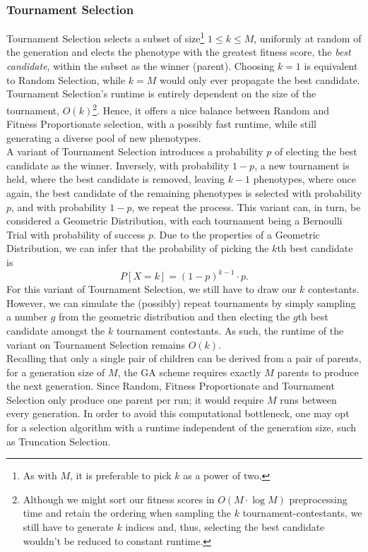 \subsubsection{Tournament Selection}
Tournament Selection selects a subset of size\footnote{As with $M$, it is preferable to pick $k$ as a power of two.} $1 \leq k \leq M$, uniformly at random of the generation and elects the phenotype with the greatest fitness score, the \textit{best candidate}, within the subset as the winner (parent). Choosing $k = 1 $ is equivalent to Random Selection, while $k = M$ would only ever propagate the best candidate.
\\
Tournament Selection's runtime is entirely dependent on the size of the tournament, $O(k)$\footnote{Although we might sort our fitness scores in $O(M \cdot \log M)$ preprocessing time and retain the ordering when sampling the $k$ tournament-contestants, we still have to generate $k$ indices and, thus, selecting the best candidate wouldn't be reduced to constant runtime.}. Hence, it offers a nice balance between Random and Fitness Proportionate selection, with a possibly fast runtime, while still generating a diverse pool of new phenotypes.
\\
A variant\cite{Wiki-tournament-selection} of Tournament Selection introduces a probability $p$ of electing the best candidate as the winner. Inversely, with probability $1-p$, a new tournament is held, where the best candidate is removed, leaving $k-1$ phenotypes, where once again, the best candidate of the remaining phenotypes is selected with probability $p$, and with probability $1-p$, we repeat the process. This variant can, in turn, be considered a Geometric Distribution, with each tournament being a Bernoulli Trial with probability of success $p$. Due to the properties\cite{Wiki-geometric-distribution} of a Geometric Distribution, we can infer that the probability of picking the $k$th best candidate is
\begin{equation*}
    P\left[ X = k \right] = (1-p)^{k-1} \cdot p.
\end{equation*}
For this variant of Tournament Selection, we still have to draw our $k$ contestants. However, we can simulate the (possibly) repeat tournaments by simply sampling a number $g$ from the geometric distribution and then electing the $g$th best candidate amongst the $k$ tournament contestants. As such, the runtime of the variant on Tournament Selection remains $O(k)$.
\\
Recalling that only a single pair of children can be derived from a pair of parents, for a generation size of $M$, the GA scheme requires exactly $M$ parents to produce the next generation. Since Random, Fitness Proportionate and Tournament Selection only produce one parent per run; it would require $M$ runs between every generation. In order to avoid this computational bottleneck, one may opt for a selection algorithm with a runtime independent of the generation size, such as Truncation Selection.

